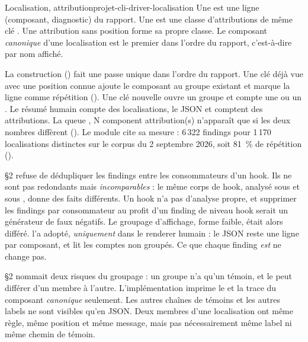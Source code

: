 \begin{definition}{Localisation, attribution}{projet-cli-driver-localisation}
Une  est une ligne \og (composant, diagnostic)\fg{} du rapport. Une  est une classe d'attributions de même clé . Une attribution sans position forme sa propre classe. Le composant \emph{canonique} d'une localisation est le premier dans l'ordre du rapport, c'est-à-dire par nom affiché.
\end{definition}


La construction () fait une passe unique dans l'ordre du rapport. Une clé déjà vue avec une position connue ajoute le composant au groupe existant et marque la ligne comme répétition (). Une clé nouvelle ouvre un groupe et compte une \Error{} ou un \Warning{}. Le résumé humain compte des localisations, le JSON et  comptent des attributions. La queue \og , N component attribution(s)\fg{} n'apparaît que si les deux nombres diffèrent (). Le module cite sa mesure : 6\,322 findings pour 1\,170 localisations distinctes sur le corpus du 2 septembre 2026, soit 81~\% de répétition ().

\begin{decision}
 §2 refuse de dédupliquer les findings entre les consommateurs d'un hook. Ils ne sont pas redondants mais \emph{incomparables} : le même corps de hook, analysé sous  et sous , donne des faits différents. Un hook n'a pas d'analyse propre, et supprimer les findings par consommateur au profit d'un finding de niveau hook serait un générateur de faux négatifs. Le groupage d'affichage, forme faible, était alors différé.  l'a adopté, \emph{uniquement} dans le renderer humain : le JSON reste une ligne par composant, et  lit les comptes non groupés. Ce que chaque finding \emph{est} ne change pas.
\end{decision}

\begin{piege}
 §2 nommait deux risques du groupage : un groupe n'a qu'un témoin, et le  peut différer d'un membre à l'autre. L'implémentation imprime le \code{[hook:N]} et la trace du composant \emph{canonique} seulement. Les autres chaînes de témoins et les autres labels ne sont visibles qu'en JSON. Deux membres d'une localisation ont même règle, même position et même message, mais pas nécessairement même label ni même chemin de témoin.
\end{piege}

